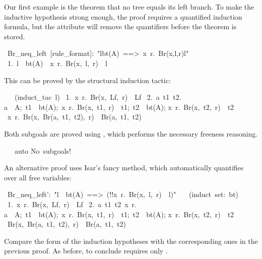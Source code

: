 Our first example is the theorem that no tree equals its
left branch.  To make the inductive hypothesis strong enough, 
the proof requires a quantified induction formula, but 
the  attribute will remove the quantifiers 
before the theorem is stored.
\begin{isabelle}
\ Br\_neq\_left\ [rule\_format]:\ "l\isasymin bt(A)\ ==>\ \isasymforall x\ r.\ Br(x,l,r)\isasymnoteq{}l"\isanewline
\ 1.\ l\ \isasymin \ bt(A)\ \isasymLongrightarrow \ \isasymforall x\ r.\ Br(x,\ l,\ r)\ \isasymnoteq \ l%
\end{isabelle}
This can be proved by the structural induction tactic:
\begin{isabelle}
\ \ \ (induct\_tac\ l)\isanewline
\ 1.\ \isasymforall x\ r.\ Br(x,\ Lf,\ r)\ \isasymnoteq \ Lf\isanewline
\ 2.\ \isasymAnd a\ t1\ t2.\isanewline
{}\isasymlbrakk a\ \isasymin \ A;\ t1\ \isasymin \ bt(A);\ \isasymforall x\ r.\ Br(x,\ t1,\ r)\ \isasymnoteq \ t1;\ t2\ \isasymin \ bt(A);\isanewline
{}\isasymforall x\ r.\ Br(x,\ t2,\ r)\ \isasymnoteq \ t2\isasymrbrakk \isanewline
{}\isasymLongrightarrow \ \isasymforall x\ r.\ Br(x,\ Br(a,\ t1,\ t2),\ r)\ \isasymnoteq \ Br(a,\ t1,\ t2)
\end{isabelle}
Both subgoals are proved using , which performs the necessary
freeness reasoning. 
\begin{isabelle}
\ \ \ auto\isanewline
No\ subgoals!\isanewline
{}
\end{isabelle}

An alternative proof uses Isar's fancy  method, which 
automatically quantifies over all free variables:

\begin{isabelle}
\ Br\_neq\_left':\ "l\ \isasymin \ bt(A)\ ==>\ (!!x\ r.\ Br(x,\ l,\ r)\ \isasymnoteq \ l)"\isanewline
\ \ \ (induct\ set:\ bt)\isanewline
\ 1.\ \isasymAnd x\ r.\ Br(x,\ Lf,\ r)\ \isasymnoteq \ Lf\isanewline
\ 2.\ \isasymAnd a\ t1\ t2\ x\ r.\isanewline
{}\isasymlbrakk a\ \isasymin \ A;\ t1\ \isasymin \ bt(A);\ \isasymAnd x\ r.\ Br(x,\ t1,\ r)\ \isasymnoteq \ t1;\ t2\ \isasymin \ bt(A);\isanewline
{}\isasymAnd x\ r.\ Br(x,\ t2,\ r)\ \isasymnoteq \ t2\isasymrbrakk \isanewline
{}\isasymLongrightarrow \ Br(x,\ Br(a,\ t1,\ t2),\ r)\ \isasymnoteq \ Br(a,\ t1,\ t2)
\end{isabelle}
Compare the form of the induction hypotheses with the corresponding ones in
the previous proof. As before, to conclude requires only .

